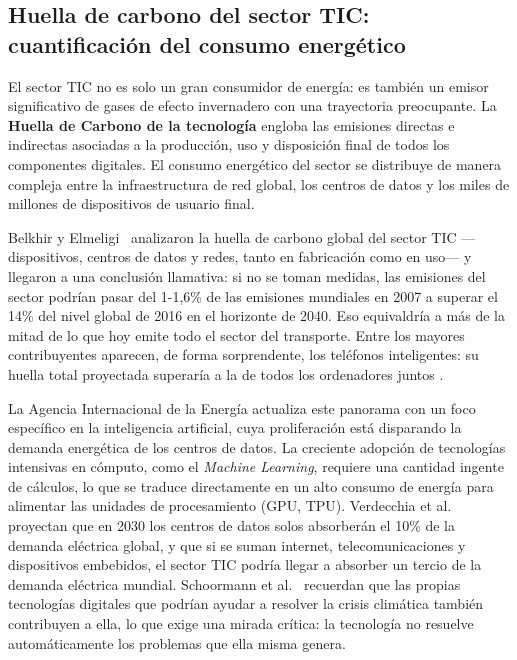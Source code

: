 \subsection{Huella de carbono del sector TIC: cuantificación del consumo energético}


El sector TIC no es solo un gran consumidor de energía: es también un emisor significativo de gases de efecto invernadero con una trayectoria preocupante. La \textbf{Huella de Carbono de la tecnología} engloba las emisiones directas e indirectas asociadas a la producción, uso y disposición final de todos los componentes digitales. El consumo energético del sector se distribuye de manera compleja entre la infraestructura de red global, los centros de datos y los miles de millones de dispositivos de usuario final.


Belkhir y Elmeligi~\cite{belkhir2018assessing} analizaron la huella de carbono global del sector TIC —dispositivos, centros de datos y redes, tanto en fabricación como en uso— y llegaron a una conclusión llamativa: si no se toman medidas, las emisiones del sector podrían pasar del 1-1,6\% de las emisiones mundiales en 2007 a superar el 14\% del nivel global de 2016 en el horizonte de 2040. Eso equivaldría a más de la mitad de lo que hoy emite todo el sector del transporte. Entre los mayores contribuyentes aparecen, de forma sorprendente, los teléfonos inteligentes: su huella total proyectada superaría a la de todos los ordenadores juntos \cite{belkhir2018assessing}.


La Agencia Internacional de la Energía \cite{iea2024energy} actualiza este panorama con un foco específico en la inteligencia artificial, cuya proliferación está disparando la demanda energética de los centros de datos. La creciente adopción de tecnologías intensivas en cómputo, como el \textit{Machine Learning}, requiere una cantidad ingente de cálculos, lo que se traduce directamente en un alto consumo de energía para alimentar las unidades de procesamiento (GPU, TPU). Verdecchia et al.~\cite{verdecchia2021green} proyectan que en 2030 los centros de datos solos absorberán el 10\% de la demanda eléctrica global, y que si se suman internet, telecomunicaciones y dispositivos embebidos, el sector TIC podría llegar a absorber un tercio de la demanda eléctrica mundial. Schoormann et al.~\cite{schoormann2025digital} recuerdan que las propias tecnologías digitales que podrían ayudar a resolver la crisis climática también contribuyen a ella, lo que exige una mirada crítica: la tecnología no resuelve automáticamente los problemas que ella misma genera.


